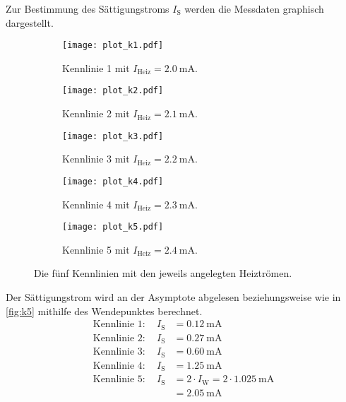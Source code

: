 Zur Bestimmung des Sättigungstroms $I_{\text{S}}$ werden die Messdaten graphisch dargestellt.
\begin{figure}
  \centering
  
  \begin{subfigure}{0.49\columnwidth}
  \centering
  \texttt{[image: plot\_k1.pdf]}
  \caption{Kennlinie 1 mit $I_\text{Heiz} = \qty{2,0}{\milli\ampere}$.}
  \label{fig:k1}
  \end{subfigure}\hfill
  \begin{subfigure}{0.49\columnwidth}
  \centering
  \texttt{[image: plot\_k2.pdf]}
  \caption{Kennlinie 2 mit $I_\text{Heiz} = \qty{2,1}{\milli\ampere}$.}
  \label{fig:k2}
  \end{subfigure}
  
  \medskip
  
  \begin{subfigure}{0.49\columnwidth}
  \centering
  \texttt{[image: plot\_k3.pdf]}
  \caption{Kennlinie 3 mit $I_\text{Heiz} = \qty{2,2}{\milli\ampere}$.}
  \label{fig:k3}
  \end{subfigure}\hfill
  \begin{subfigure}{0.49\columnwidth}
  \centering
  \texttt{[image: plot\_k4.pdf]}
  \caption{Kennlinie 4 mit $I_\text{Heiz} = \qty{2,3}{\milli\ampere}$.}
  \label{fig:k4}
  \end{subfigure}
  
  \medskip
  
  \begin{subfigure}{0.49\columnwidth}
  \centering
  \texttt{[image: plot\_k5.pdf]}
  \caption{Kennlinie 5 mit $I_\text{Heiz} = \qty{2,4}{\milli\ampere}$.}
  \label{fig:k5}
  \end{subfigure}
  
  \caption{Die fünf Kennlinien mit den jeweils angelegten Heiztrömen.}
  \label{fig:k}
\end{figure}

Der Sättigungstrom wird an der Asymptote abgelesen beziehungsweise wie in \autoref{fig:k5} 
mithilfe des Wendepunktes berechnet.
\begin{align*}
  \text{Kennlinie 1} : \quad I_\text{S} &= \qty{0,12}{\milli\ampere} \\
  \text{Kennlinie 2} : \quad I_\text{S} &= \qty{0,27}{\milli\ampere} \\
  \text{Kennlinie 3} : \quad I_\text{S} &= \qty{0,60}{\milli\ampere} \\
  \text{Kennlinie 4} : \quad I_\text{S} &= \qty{1,25}{\milli\ampere} \\
  \text{Kennlinie 5} : \quad I_\text{S} &= 2 \cdot I_\text{W} = 2 \cdot \qty{1,025}{\milli\ampere} \\
                                        &= \qty{2,05}{\milli\ampere}
\end{align*}

